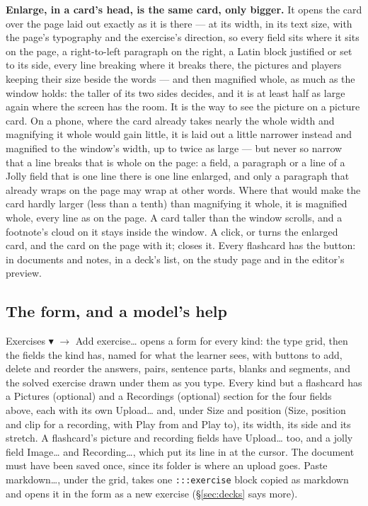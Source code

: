 \documentclass[11pt,oneside]{report}
\newcommand{\sym}[1]{{\symfont #1}}
\newcommand{\key}[1]{\textsf{\small\fbox{#1}}}
\newcommand{\menu}[1]{\textsf{#1}}
\begin{document}
\textbf{\menu{Enlarge}, in a card's head, is the same card, only bigger.} It
opens the card over the page laid out exactly as it is there --- at its
width, in its text size, with the page's typography and the exercise's
direction, so every field sits where it sits on the page, a right-to-left
paragraph on the right, a Latin block justified or set to its side, every
line breaking where it breaks there, the pictures and players keeping their
size beside the words --- and then magnified whole, as much as the window
holds: the taller of its two sides decides, and it is at least half as large
again where the screen has the room. It is the way to see the picture on a
picture card. On a phone, where the card already takes nearly the whole
width and magnifying it whole would gain little, it is laid out a little
narrower instead and magnified to the window's width, up to twice as large
--- but never so narrow that a line breaks that is whole on the page: a
field, a paragraph or a line of a Jolly field that is one line there is one
line enlarged, and only a paragraph that already wraps on the page may wrap
at other words. Where that would make the card hardly larger (less than a
tenth) than magnifying it whole, it is magnified whole, every line as on the
page. A card taller than the window scrolls, and a footnote's cloud on it
stays inside the window. A click, \key{Space} or \key{Enter} turns the
enlarged card, and the card on the page with it; \key{Esc} closes it. Every
flashcard has the button: in documents and notes, in a deck's list, on the
study page and in the editor's preview.

\subsection*{The form, and a model's help}

\menu{Exercises \sym{▾}} $\rightarrow$ \menu{Add exercise\ldots} opens a form
for every kind: the type grid, then the fields the kind has, named for what
the learner sees, with buttons to add, delete and reorder the answers, pairs,
sentence parts, blanks and segments, and the solved exercise drawn under
them as you type. Every kind but a flashcard has a \menu{Pictures
(optional)} and a \menu{Recordings (optional)} section for the four fields
above, each with its own \menu{Upload\ldots} and, under \menu{Size and
position} (\menu{Size, position and clip} for a recording, with \menu{Play
from} and \menu{Play to}), its width, its side and its stretch. A
flashcard's picture and recording fields have \menu{Upload\ldots} too, and a
jolly field \menu{Image\ldots} and \menu{Recording\ldots}, which put its line
in at the cursor. The document must have been saved once, since its folder
is where an upload goes. \menu{Paste markdown\ldots}, under the grid, takes
one \texttt{:::exercise} block copied as markdown and opens it in the form
as a new exercise (\S\ref{sec:decks} says more).
\end{document}
